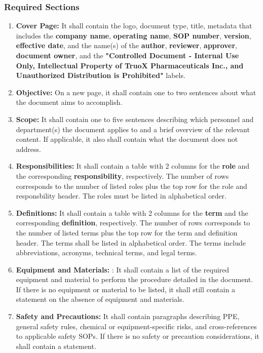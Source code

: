 \documentclass[11pt]{article}
\begin{document}
\subsubsection{Required Sections}
    \begin{enumerate}
        \item \textbf{Cover Page:} It shall contain the logo, document type, title, metadata that includes the \textbf{company name}, \textbf{operating name}, \textbf{SOP number}, \textbf{version}, \textbf{effective date}, and the name(s) of the \textbf{author}, \textbf{reviewer}, \textbf{approver}, \textbf{document owner}, and the \textbf{"Controlled Document - Internal Use Only, Intellectual Property of TruoX Pharmaceuticals Inc., and Unauthorized Distribution is Prohibited"} labels.
        \item \textbf{Objective:} On a new page, it shall contain one to two sentences about what the document aims to accomplish.
        \item \textbf{Scope:} It shall contain one to five sentences describing which personnel and department(s) the document applies to and a brief overview of the relevant content. If applicable, it also shall contain what the document does not address.
        \item \textbf{Responsibilities:} It shall contain a table with 2 columns for the \textbf{role} and the corresponding \textbf{responsibility}, respectively. The number of rows corresponds to the number of listed roles plus the top row for the role and responsbility header. The roles must be listed in alphabetical order.
        \item \textbf{Definitions:} It shall contain a table with 2 columns for the \textbf{term} and the corresponding \textbf{definition}, respectively. The number of rows corresponds to the number of listed terms plus the top row for the term and definition header. The terms shall be listed in alphabetical order. The terms include abbreviations, acronyms, technical terms, and legal terms.
        \item \textbf{Equipment and Materials:} : It shall contain a list of the required equipment and material to perform the procedure detailed in the document. If there is no equipment or material to be listed, it shall still contain a statement on the absence of equipment and materials.
        \item \textbf{Safety and Precautions:} It shall contain paragraphs describing PPE, general safety rules, chemical or equipment-specific risks, and cross-references to applicable safety SOPs. If there is no safety or precaution considerations, it shall contain a statement.

\end{enumerate}
\end{document}
